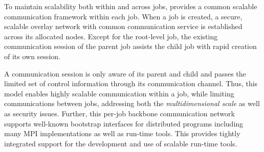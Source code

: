
To maintain scalability both within and across jobs, \flux 
provides a common scalable communication 
framework within each job. When a job is created, a secure, scalable 
overlay network with common communication service is established 
across its allocated nodes. Except for the root-level job, 
the existing communication session of the parent job assists 
the child job with rapid creation of its own session. 

A communication session is only aware of its parent 
and child and passes the limited set of control information 
through its communication channel. Thus, this model 
enables highly scalable communication within a job, while 
limiting communications between jobs, addressing 
both the {\em multidimensional scale} as well as security issues.
Further, this per-job backbone communication network 
supports well-known bootstrap interfaces 
for distributed programs including many MPI implementations 
as well as run-time tools. This provides tightly integrated support
for the development and use of scalable run-time tools.
